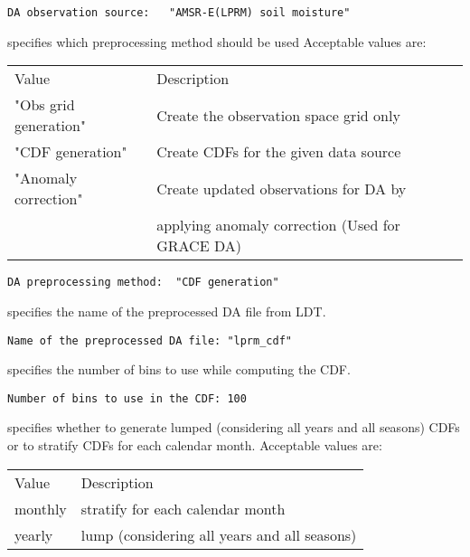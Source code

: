  \begin{Verbatim}[frame=single]
DA observation source:   "AMSR-E(LPRM) soil moisture"
 \end{Verbatim}

 
 specifies which preprocessing method should be used
 Acceptable values are:

 \begin{tabular}{ll}
 Value     & Description                                  \\
 "Obs grid generation"  & Create the observation space grid only \\
 "CDF generation"       & Create CDFs for the given data source \\
 "Anomaly correction"   & Create updated observations for DA by \\
                        & applying anomaly correction (Used for GRACE DA)\\
 \end{tabular}

 

 \begin{Verbatim}[frame=single]
DA preprocessing method:  "CDF generation"
 \end{Verbatim}

 
 specifies the name of the preprocessed DA file from LDT. 
 

 \begin{Verbatim}[frame=single]
Name of the preprocessed DA file: "lprm_cdf"
 \end{Verbatim}

 
 specifies the number of bins to use while computing the CDF.
 

 \begin{Verbatim}[frame=single]
Number of bins to use in the CDF: 100 
 \end{Verbatim}

 
  specifies whether to generate
 lumped (considering all years and all seasons) CDFs or to stratify CDFs
 for each calendar month.
 Acceptable values are:

 \begin{tabular}{ll}
 Value     & Description                                  \\
 monthly   & stratify for each calendar month             \\
 yearly    & lump (considering all years and all seasons) \\
 \end{tabular}
 


